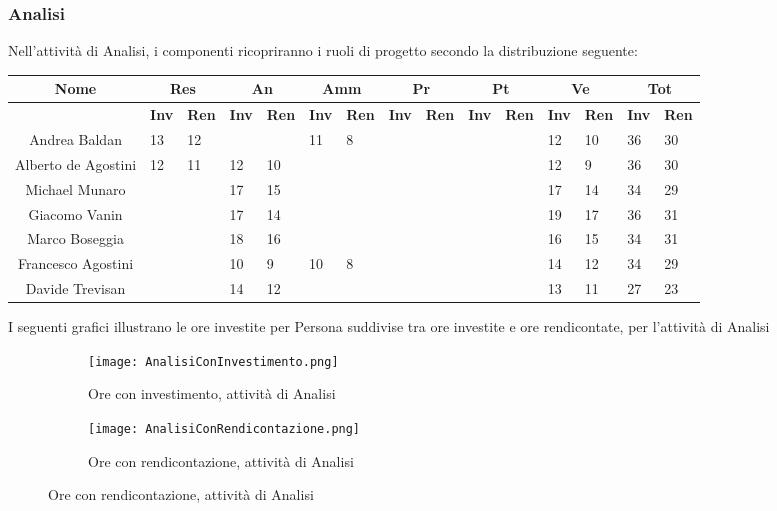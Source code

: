 \documentclass{scalatekids-article}
\begin{document}
\subsubsection{Analisi}
Nell'attività di Analisi, i componenti ricopriranno i ruoli di progetto secondo la distribuzione seguente:
\begin{center}
  \scriptsize
  \begin{tabular}{| c | p{0.35cm} p{0.35cm} | p{0.35cm} p{0.35cm} | p{0.35cm} p{0.35cm} | p{0.35cm} p{0.35cm} | p{0.35cm} p{0.35cm} | p{0.35cm} p{0.35cm} | p{0.35cm} p{0.35cm} |}
    \hline
    \textbf{Nome} & \multicolumn{2}{|c|}{\textbf{Res}} & \multicolumn{2}{|c|}{\textbf{An}} & \multicolumn{2}{|c|}{\textbf{Amm}} & \multicolumn{2}{|c|}{\textbf{Pr}} & \multicolumn{2}{|c|}{\textbf{Pt}} & \multicolumn{2}{|c|}{\textbf{Ve}} & \multicolumn{2}{|c|}{\textbf{Tot}}\\
    \hline
    & \textbf{Inv} & \textbf{Ren} & \textbf{Inv} & \textbf{Ren} & \textbf{Inv} & \textbf{Ren} & \textbf{Inv} & \textbf{Ren} & \textbf{Inv} & \textbf{Ren} & \textbf{Inv} & \textbf{Ren} & \textbf{Inv} & \textbf{Ren}\\
    \hline
    Andrea Baldan & 13 & 12 & & & 11 & 8 & & & & & 12 & 10 & 36 & 30\\
    Alberto de Agostini & 12 & 11 & 12 & 10 & & & & & & & 12 & 9 & 36 & 30\\
    Michael Munaro & & & 17 & 15 & & & & & & & 17 & 14 & 34 & 29\\
    Giacomo Vanin & & & 17 & 14 & & & & & & & 19 & 17 & 36 & 31\\
    Marco Boseggia & & & 18 & 16 & & & & & & & 16 & 15 & 34 & 31\\
    Francesco Agostini & & & 10 & 9 & 10 & 8 & & & & & 14 & 12 & 34 & 29\\
    Davide Trevisan & & & 14 & 12 & & & & & & & 13 & 11 & 27 & 23\\
    \hline
  \end{tabular}
\end{center}
I seguenti grafici illustrano le ore investite per Persona suddivise tra ore investite e ore rendicontate, per l'attività di Analisi
\begin{figure}[H]
  \begin{subfigure}[H]{0.47\textwidth}
    \texttt{[image: AnalisiConInvestimento.png]}
    \caption{Ore con investimento, attività di Analisi}
  \end{subfigure}
  \qquad
  \begin{subfigure}[H]{0.47\textwidth}
    \texttt{[image: AnalisiConRendicontazione.png]}
    \caption{Ore con rendicontazione, attività di Analisi}
  \end{subfigure}
\end{figure}
\end{document}
